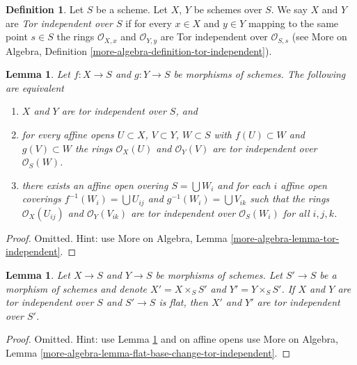 \documentclass{stacks-project}
\theoremstyle{plain}
\newtheorem{lemma}[subsection]{Lemma}
\theoremstyle{definition}
\newtheorem{definition}[subsection]{Definition}
\theoremstyle{remark}
\numberwithin{equation}{subsection}
\begin{document}
\begin{definition}
\label{definition-tor-independent}
Let $S$ be a scheme. Let $X$, $Y$ be schemes over $S$. We say $X$ and
$Y$ are {\it Tor independent over $S$} if for every $x \in X$ and
$y \in Y$ mapping to the same point $s \in S$ the rings
$\mathcal{O}_{X, x}$ and $\mathcal{O}_{Y, y}$ are Tor independent
over $\mathcal{O}_{S, s}$ (see
More on Algebra, Definition \ref{more-algebra-definition-tor-independent}).
\end{definition}

\begin{lemma}
\label{lemma-tor-independent}
Let $f : X \to S$ and $g : Y \to S$ be morphisms of schemes.
The following are equivalent
\begin{enumerate}
\item $X$ and $Y$ are tor independent over $S$, and
\item for every affine opens $U \subset X$, $V \subset Y$, $W \subset S$
with $f(U) \subset W$ and $g(V) \subset W$ the rings
$\mathcal{O}_X(U)$ and $\mathcal{O}_Y(V)$ are tor independent over
$\mathcal{O}_S(W)$.
\item there exists an affine open overing $S = \bigcup W_i$ and
for each $i$ affine open coverings $f^{-1}(W_i) = \bigcup U_{ij}$
and $g^{-1}(W_i) = \bigcup V_{ik}$ such that the rings
$\mathcal{O}_X(U_{ij})$ and $\mathcal{O}_Y(V_{ik})$ are tor independent over
$\mathcal{O}_S(W_i)$ for all $i, j, k$.
\end{enumerate}
\end{lemma}

\begin{proof}
Omitted. Hint: use More on Algebra, Lemma
\ref{more-algebra-lemma-tor-independent}.
\end{proof}

\begin{lemma}
\label{lemma-flat-base-change-tor-independent}
Let $X \to S$ and $Y \to S$ be morphisms of schemes. Let $S' \to S$ be a
morphism of schemes and denote $X' = X \times_S S'$
and $Y' = Y \times_S S'$.
If $X$ and $Y$ are tor independent over $S$ and $S' \to S$ is flat,
then $X'$ and $Y'$ are tor independent over $S'$.
\end{lemma}

\begin{proof}
Omitted. Hint: use Lemma \ref{lemma-tor-independent} and
on affine opens use More on Algebra, Lemma
\ref{more-algebra-lemma-flat-base-change-tor-independent}.
\end{proof}
\end{document}
